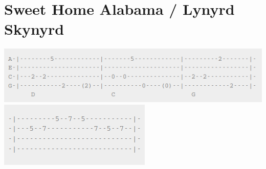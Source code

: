 \section{Sweet Home Alabama / Lynyrd Skynyrd}\label{sec:sweethomealabama}

\includegraphics[scale=.6]{songs/s/SweetHomeRiff1.png}\\
\includegraphics[scale=.6]{songs/s/SweetHomeRiff2.png}

\DmajorEasy
\Cmajor
\Gmajor
\Fmajor

